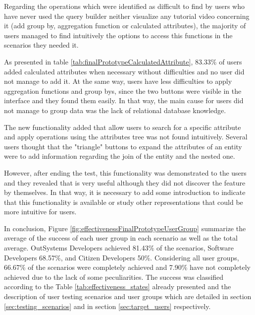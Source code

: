 
Regarding the operations which were identified as difficult to find by users who have never used the query builder neither visualize any tutorial video concerning it (add group by, aggregation function or calculated attributes), the majority of users managed to find intuitively the options to access this functions in the scenarios they needed it.

As presented in table \ref{tab:finalPrototypeCalculatedAttribute}, 83.33\% of users added calculated attributes when necessary without difficulties and no user did not manage to add it. At the same way, users have less difficulties to apply aggregation functions and group bys, since the two buttons were visible in the interface and they found them easily. In that way, the main cause for users did not manage to group data was the lack of relational database knowledge.


The new functionality added that allow users to search for a specific attribute and apply operations using the attributes tree was not found intuitively. Several users thought that the "triangle" buttons to expand the attributes of an entity were to add information regarding the join of the entity and the nested one.

However, after ending the test, this functionality was demonstrated to the users and they revealed that is very useful although they did not discover the feature by themselves. In that way, it is necessary to add some introduction to indicate that this functionality is available or study other representations that could be more intuitive for users.

In conclusion, Figure \ref{fig:effectivenessFinalPrototypeUserGroup} summarize the average of the success of each user group in each scenario as well as the total average. OutSystems Developers achieved 81.43\% of the scenarios, Software Developers 68.57\%, and Citizen Developers 50\%. Considering all user groups, 66.67\% of the scenarios were completely achieved and 7.90\% have not completely achieved due to the lack of some peculiarities. The success was classified according to the Table \ref{tab:effectiveness_states} already presented and the description of user testing scenarios and user groups which are detailed in section \ref{sec:testing_scenarios} and in section \ref{sec:target_users} respectively.


